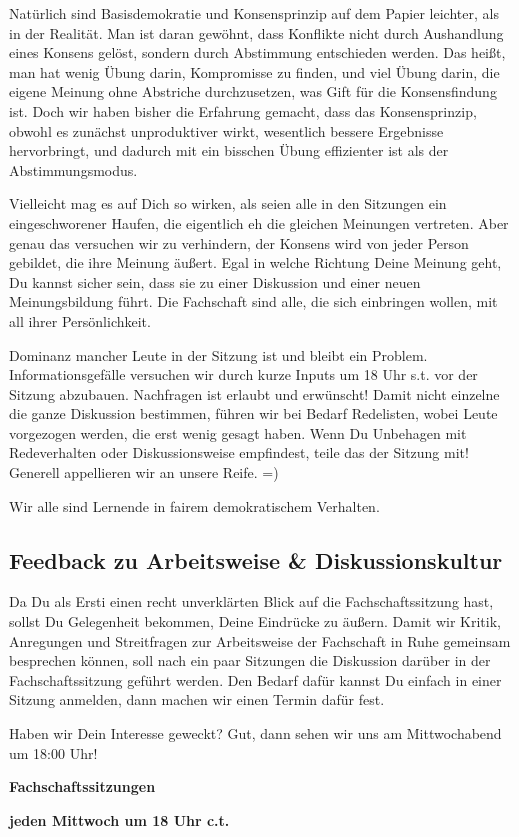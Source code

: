 Natürlich sind Basisdemokratie und Konsensprinzip auf dem Papier leichter, als in der Realität. Man ist daran gewöhnt, dass Konflikte nicht durch Aushandlung eines Konsens gelöst, sondern durch Abstimmung entschieden werden. Das heißt, man hat wenig Übung darin, Kompromisse zu finden, und viel Übung darin, die eigene Meinung ohne Abstriche durchzusetzen, was Gift für die Konsensfindung ist. Doch wir haben bisher die Erfahrung gemacht, dass das Konsensprinzip, obwohl es zunächst unproduktiver wirkt, wesentlich bessere Ergebnisse hervorbringt, und dadurch mit ein bisschen Übung effizienter ist als der Abstimmungsmodus.

Vielleicht mag es auf Dich so wirken, als seien alle in den Sitzungen ein eingeschworener Haufen, die eigentlich eh die gleichen Meinungen vertreten. Aber genau das versuchen wir zu verhindern, der Konsens wird von jeder Person gebildet, die ihre Meinung äußert. Egal in welche Richtung Deine Meinung geht, Du kannst sicher sein, dass sie zu einer Diskussion und einer neuen Meinungsbildung führt. Die Fachschaft sind alle, die sich einbringen wollen, mit all ihrer Persönlichkeit.

Dominanz mancher Leute in der Sitzung ist und bleibt ein Problem. Informationsgefälle versuchen wir durch kurze Inputs um 18 Uhr \gls{s.t.} vor der Sitzung abzubauen. Nachfragen ist erlaubt und erwünscht! Damit nicht einzelne die ganze Diskussion bestimmen, führen wir bei Bedarf Redelisten, wobei Leute vorgezogen werden, die erst wenig gesagt haben. Wenn Du Unbehagen mit Redeverhalten oder Diskussionsweise empfindest, teile das der Sitzung mit! Generell appellieren wir an unsere Reife. =)

Wir alle sind Lernende in fairem demokratischem Verhalten.

\subsection{Feedback zu Arbeitsweise \& Diskussionskultur}

Da Du als Ersti einen recht unverklärten Blick auf die Fachschaftssitzung hast, sollst Du Gelegenheit bekommen, Deine Eindrücke zu äußern. Damit wir Kritik, Anregungen und Streitfragen zur Arbeitsweise der Fachschaft in Ruhe gemeinsam besprechen können, soll nach ein paar Sitzungen die Diskussion darüber in der Fachschaftssitzung geführt werden. Den Bedarf dafür kannst Du einfach in einer Sitzung anmelden, dann machen wir einen Termin dafür fest.

Haben wir Dein Interesse geweckt? Gut, dann sehen wir uns am Mittwochabend um 18:00 Uhr!

\begin{center}
\large
\textbf{Fachschaftssitzungen}

\textbf{jeden Mittwoch um 18 Uhr \gls{c.t.}}
\end{center}
